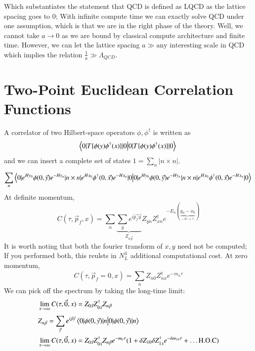 Which substantiates the statement that QCD is defined as LQCD as the lattice spacing goes to 0; With infinite compute time we can exactly solve QCD under one assumption, which is that we are in the right phase of the theory. Well, we cannot take $a\rightarrow 0$ as we are bound by classical compute architecture and finite time. However, we can let the lattice spacing $a \gg \text{any interesting scale in QCD}$ which implies the relation $\frac{1}{a} \gg \Lambda_{QCD}$. 

\section{Two-Point Euclidean Correlation Functions}
A correlator of two Hilbert-space operators $\phi,\phi^\dagger$ is written as 
\begin{equation}
    \braket{0|T\{\phi(y)\phi^{\dagger}(x)\}|0} \\
\end{equation}and we can insert a complete set of states $1 = \sum_{n}^{} |n\times n|$.
\begin{equation}
    \sum_{n}^{} \braket{0|e^{Hy_0}\phi(0,\vec{y})e^{-Hy_n} | n \times n | e^{Hx_0}\phi^{\dagger}(0,\vec{x})e^{-Hx_n}|0} \\
\end{equation} At definite momentum,
\begin{equation}
    C(\tau,\vec{p}_f,x) = \sum_{n}^{} \underbrace{\sum_{y}^{} e^{i\vec{p_f}\vec{y}}}_{Z_{n\vec{p}}} Z_{yn}Z_{xn}^\dagger e^{-E_n(\underbrace{y_0-x_0}_{-it \to \tau})}    
\end{equation}
It is worth noting that both the fourier transform of $x,y$ need not be computed; If you performed both, this reulsts in $N_L^3$ additional computational cost. 
At zero momentum, 
\begin{equation}
    C(\tau,\vec{p}_f=0,x) = \sum_{n}^{} Z_{n0}Z_{nx}^\dagger e^{-m_n\tau} 
\end{equation} 
We can pick off the spectrum by taking the long-time limit: 
\begin{align}
    & \lim_{\tau \to \infty}C(\tau,\vec{0},x) = Z_{0\vec{x}}Z_{0\vec{x}}^\dagger Z_{n\vec{p}}  \\
    & Z_{n\vec{p}} = \sum_{\vec{y}}^{} e^{i\vec{p}\vec{y}}\braket{0|\phi(0,\vec{y})|n} \\ 

    & \lim_{\tau \to \infty}C(\tau,\vec{0},x) = Z_{0\vec{x}}Z_{0\vec{x}}^\dagger Z_{n\vec{p}}e^{-m_0\tau}(1+ \delta Z_{10}\delta Z_{1x}^\dagger e^{-\delta m_{10}\tau} + \dots \text{H.O.C})  
\end{align}
